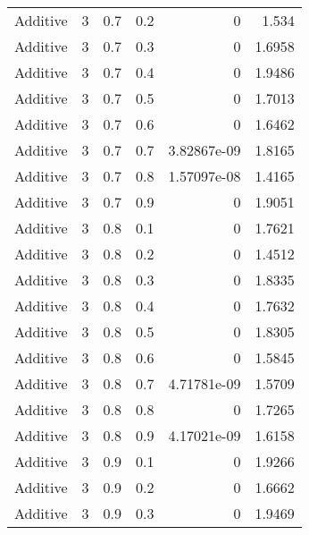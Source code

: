 \documentclass{article}
\begin{document}
\begin{longtable}[H]{lrrrrr}
 Additive       &       3 &   0.7 &            0.2 &      0           &          1.534  \\
 Additive       &       3 &   0.7 &            0.3 &      0           &          1.6958 \\
 Additive       &       3 &   0.7 &            0.4 &      0           &          1.9486 \\
 Additive       &       3 &   0.7 &            0.5 &      0           &          1.7013 \\
 Additive       &       3 &   0.7 &            0.6 &      0           &          1.6462 \\
 Additive       &       3 &   0.7 &            0.7 &      3.82867e-09 &          1.8165 \\
 Additive       &       3 &   0.7 &            0.8 &      1.57097e-08 &          1.4165 \\
 Additive       &       3 &   0.7 &            0.9 &      0           &          1.9051 \\
 Additive       &       3 &   0.8 &            0.1 &      0           &          1.7621 \\
 Additive       &       3 &   0.8 &            0.2 &      0           &          1.4512 \\
 Additive       &       3 &   0.8 &            0.3 &      0           &          1.8335 \\
 Additive       &       3 &   0.8 &            0.4 &      0           &          1.7632 \\
 Additive       &       3 &   0.8 &            0.5 &      0           &          1.8305 \\
 Additive       &       3 &   0.8 &            0.6 &      0           &          1.5845 \\
 Additive       &       3 &   0.8 &            0.7 &      4.71781e-09 &          1.5709 \\
 Additive       &       3 &   0.8 &            0.8 &      0           &          1.7265 \\
 Additive       &       3 &   0.8 &            0.9 &      4.17021e-09 &          1.6158 \\
 Additive       &       3 &   0.9 &            0.1 &      0           &          1.9266 \\
 Additive       &       3 &   0.9 &            0.2 &      0           &          1.6662 \\
 Additive       &       3 &   0.9 &            0.3 &      0           &          1.9469 \\

\end{longtable}
\end{document}
